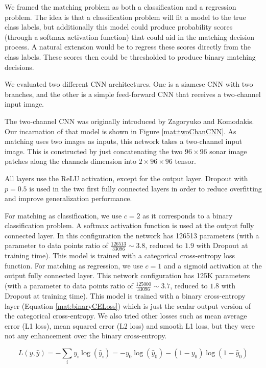 We framed the matching problem as both a classification and a regression problem. The idea is that a classification problem will fit a model to the true class labels, but additionally this model could produce probability scores (through a softmax activation function) that could aid in the matching decision process. A natural extension would be to regress these scores directly from the class labels. These scores then could be thresholded to produce binary matching decisions.

We evaluated two different CNN architectures. One is a siamese CNN with two branches, and the other is a simple feed-forward CNN that receives a two-channel input image.

The two-channel CNN was originally introduced by Zagoryuko and Komodakis. Our incarnation of that model is shown in Figure \ref{mat:twoChanCNN}. As matching uses two images as inputs, this network takes a two-channel input image. This is constructed by just concatenating the two $96 \times 96$ sonar image patches along the channels dimension into $2 \times 96 \times 96$ tensor.

All layers use the ReLU activation, except for the output layer. Dropout \cite{srivastava2014dropout} with $p = 0.5$ is used in the two first fully connected layers in order to reduce overfitting and improve generalization performance.

For matching as classification, we use $c = 2$ as it corresponds to a binary classification problem. A softmax activation function is used at the output fully connected layer. In this configuration the network has 126513 parameters (with a parameter to data points ratio of $\frac{126513}{33096} \sim 3.8$, reduced to $1.9$ with Dropout at training time). This model is trained with a categorical cross-entropy loss function.
For matching as regression, we use $c = 1$ and a sigmoid activation at the output fully connected layer. This network configuration has 125K parameters (with a parameter to data points ratio of $\frac{125000}{33096} \sim 3.7$, reduced to $1.8$ with Dropout at training time). This model is trained with a binary cross-entropy layer (Equation \ref{mat:binaryCELoss}) which is just the scalar output version of the categorical cross-entropy. We also tried other losses such as mean average error (L1 loss), mean squared error (L2 loss) and smooth L1 loss, but they were not any enhancement over the binary cross-entropy.

\begin{equation}
	L(y, \hat{y}) = - \sum_i y_i \log(\hat{y}_i) = -y_0 \log(\hat{y}_0) - (1 - y_0) \log(1 - \hat{y}_0)
	\label{mat:binaryCELoss}
\end{equation}

